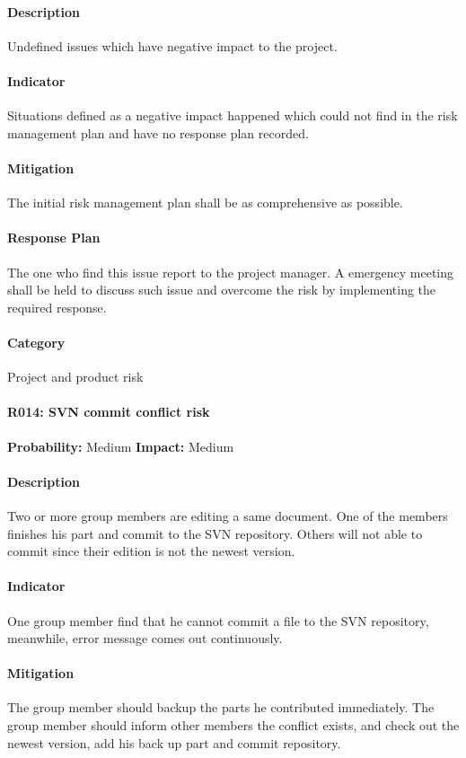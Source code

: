 \documentclass[11pt, a4paper]{report}
\begin{document}
	\paragraph{Description}Undefined issues which have negative impact to the project.
	\paragraph{Indicator}Situations defined as a negative impact happened which could not find in the risk management plan and have no response plan recorded.
	\paragraph{Mitigation}The initial risk management plan shall be as comprehensive as possible.
	\paragraph{Response Plan}The one who find this issue report to the project manager. A emergency meeting shall be held to discuss such issue and overcome the risk by implementing the required response.  \\
	\paragraph{Category}Project and product risk

	\pagebreak
	\paragraph{R014: SVN commit conflict risk} \hspace{1cm} \textbf{Probability: }Medium\hspace{1cm}   \textbf{Impact: }Medium
	\paragraph{Description}Two or more group members are editing a same document. One of the members finishes his part and commit to the SVN repository. Others will not able to commit since their edition is not the newest version.
	\paragraph{Indicator}One group member find that he cannot commit a file to the SVN repository, meanwhile, error message comes out continuously.
	\paragraph{Mitigation}The group member should backup the parts he contributed immediately. The group member should inform other members the conflict exists, and check out the newest version, add his back up part and commit repository.
\end{document}
